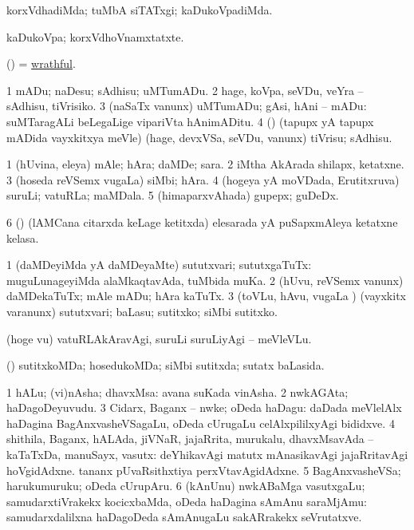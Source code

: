 \begin{center}
\bentry
{} 
\gl{\kirxvi}
\expl{}
\bmng
korxVdhadiMda; tuMbA siTATxgi; kaDukoVpadiMda. 
\emng
\eentry

\bentry
{} 
\gl{\nA}
\expl{}
\bmng
kaDukoVpa; korxVdhoVnamxtatxte. 
\emng
\eentry

\bentry
{} 
\gl{\gu}
\expl{}
\bmng
(\ame) = \hyperlink{wrathful}{wrathful}. 
\emng
\eentry

\bentry
{} 
\gl{\sakirx}
\expl{}
\bmng
\bnum
\num{1} mADu; naDesu; sAdhisu; uMTumADu. 
\num{2} hage, koVpa, seVDu, veYra -- sAdhisu, tiVrisiko. 
\num{3} (naSaTx \mo vanunx) uMTumADu; gAsi, hAni -- mADu:  suMTaragALi beLegaLige vipariVta hAnimADitu. 
\num{4} (\pArxparx) (tapupx yA tapupx mADida vayxkitxya meVle) (hage, devxVSa, seVDu, \mo vanunx) tiVrisu; sAdhisu. 
\enum
\emng
\eentry

\bentry
{} 
\gl{\nA}
\bmng
\bnum
\num{1} (hUvina, eleya) mAle; hAra; daMDe; sara. 
\num{2} iMtha AkArada shilapx, ketatxne. 
\num{3} (hoseda reVSemx \mo vugaLa) siMbi; hAra. 
\num{4} (hogeya yA moVDada, Erutitxruva) suruLi; vatuRLa; maMDala. 
\num{5} (himaparxvAhada) gupepx; guDeDx. 
\num{6} (\vaMlAM) (lAMCana citarxda keLage ketitxda) elesarada yA puSapxmAleya ketatxne kelasa. 
\enum
\emng
\eentry

\bentry 
{} 
\gl{\sakirx}
\expl{}
\bmng
\bnum
\num{1} (daMDeyiMda yA daMDeyaMte) sututxvari; sututxgaTuTx:  muguLunageyiMda alaMkaqtavAda, tuMbida muKa. 
\num{2} (hUvu, reVSemx \mo vanunx) daMDekaTuTx; mAle mADu; hAra kaTuTx. 
\num{3} (toVLu, hAvu, \mo vugaLa \vi) (vayxkitx \mo varanunx) sututxvari; baLasu; sutitxko; siMbi sutitxko. 
\enum
\emng

\noindent
\gl{\akirx}
\expl{}
\bmng
(hoge \mo vu) vatuRLAkAravAgi, suruLi suruLiyAgi -- meVleVLu. 
\emng
\eentry

\bentry
{} 
\gl{\gu}
\expl{}
\bmng
(\pArxparx) sutitxkoMDa; hosedukoMDa; siMbi sutitxda; sutatx baLasida. 
\emng
\eentry

\bentry
{} 
\gl{\nA}
\expl{}
\bmng
\bnum
\num{1} hALu; (vi)nAsha; dhavxMsa:  avana suKada vinAsha. 
\num{2} nwkAGAta; haDagoDeyuvudu. 
\num{3} Cidarx, Baganx -- nwke; oDeda haDagu:  daDada meVlelAlx haDagina BagAnxvasheVSagaLu, oDeda cUrugaLu celAlxpililxyAgi bididxve. 
\num{4} shithila, Baganx, hALAda, jiVNaR, jajaRrita, murukalu, dhavxMsavAda -- kaTaTxDa, manuSayx, vasutx:  deYhikavAgi matutx mAnasikavAgi jajaRritavAgi hoVgidAdxne.  tananx pUvaRsithxtiya perxVtavAgidAdxne. 
\num{5} BagAnxvasheVSa; harukumuruku; oDeda cUrupAru. 
\num{6} (kAnUnu) nwkABaMga vasutxgaLu; samudarxtiVrakekx kocicxbaMda, oDeda haDagina sAmAnu saraMjAmu:  samudarxdalilxna haDagoDeda sAmAnugaLu sakARrakekx seVrutatxve. 
\enum
\emng
\eentry


\end{center}
